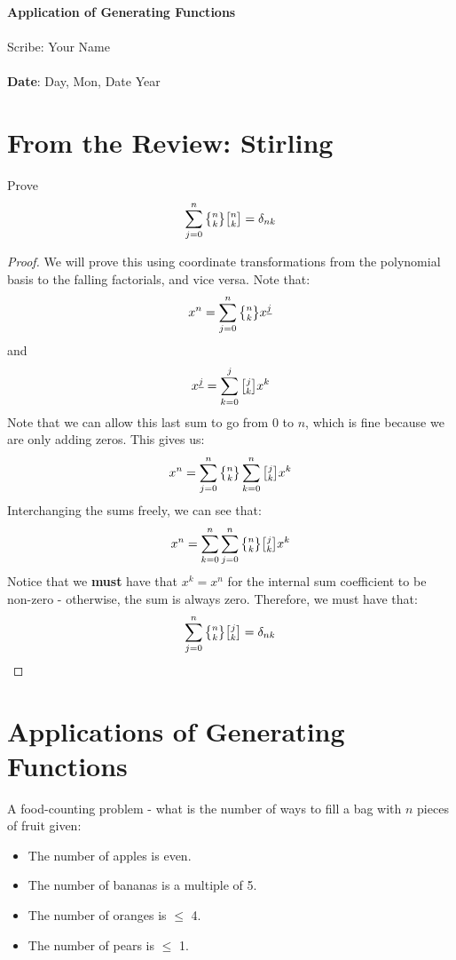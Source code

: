 \documentclass[11pt,twosided]{article}
\def\titlestring{Application of Generating Functions}
\def\scribestring{Your Name}
\def\datestring{Day, Mon, Date Year}
\begin{document}
\thispagestyle{plain}  %

\noindent
{\LARGE \textbf{\titlestring}}\\\\
%
{\Large Scribe: \scribestring}\\ \\
{\textbf{Date}: \datestring}


\noindent

\section{From the Review: Stirling}
\begin{problem}{1}
	Prove 
	\[
		\sum_{j=0}^n \stirii{n}{k} \stiri{n}{k} = \delta_{nk}
	\]
\end{problem}
\begin{proof}
We will prove this using coordinate transformations from the polynomial basis to the falling factorials, and vice versa. Note that:
\[
	x^n = \sum_{j=0}^n \stirii{n}{k} \ffact{x}{j}
\]
and 
\[
	\ffact{x}{j} = \sum_{k=0}^j \stiri{j}{k} x^k 
\]
Note that we can allow this last sum to go from $0$ to $n$, which is fine because we are only adding zeros. This gives us: 
\[
	x^n = \sum_{j=0}^n \stirii{n}{k}\sum_{k=0}^n \stiri{j}{k} x^k 
\]
Interchanging the sums freely, we can see that: 
\[
	x^n = \sum_{k=0}^n \sum_{j=0}^n \stirii{n}{k} \stiri{j}{k} x^k 
\]
Notice that we \textbf{must} have that $x^k = x^n$ for the internal sum coefficient to be non-zero - otherwise, the sum is always zero. Therefore, we must have that: 
\[
	\sum_{j=0}^n \stirii{n}{k} \stiri{j}{k}  = \delta_{nk}
\]
\end{proof}

\section{Applications of Generating Functions}
\begin{problem}{2}
A food-counting problem - what is the number of ways to fill a bag with $n$ pieces of fruit given:
\begin{itemize}
\item The number of apples is even. 
\item The number of bananas is a multiple of 5.
\item The number of oranges is $\leq$ 4. 
\item The number of pears is $\leq$ 1. 
\end{itemize}
\end{problem}
\end{document}

